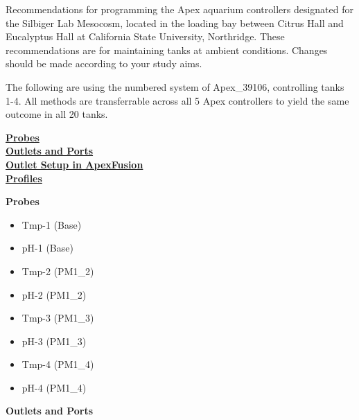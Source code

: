 \documentclass[]{book}
\providecommand{\tightlist}{%
  \setlength{\itemsep}{0pt}\setlength{\parskip}{0pt}}
\begin{document}
Recommendations for programming the Apex aquarium controllers designated
for the Silbiger Lab Mesocosm, located in the loading bay between Citrus
Hall and Eucalyptus Hall at California State University, Northridge.
These recommendations are for maintaining tanks at ambient conditions.
Changes should be made according to your study aims.

The following are using the numbered system of Apex\_39106, controlling
tanks 1-4. All methods are transferrable across all 5 Apex controllers
to yield the same outcome in all 20 tanks.

\protect\hyperlink{Probes}{\textbf{Probes}}\\
\protect\hyperlink{Outlets_and_Ports}{\textbf{Outlets and Ports}}\\
\protect\hyperlink{Outlet_Setup}{\textbf{Outlet Setup in ApexFusion}}\\
\protect\hyperlink{Profiles}{\textbf{Profiles}}

 \textbf{Probes}

\begin{itemize}
\tightlist
\item
  Tmp-1 (Base)
\item
  pH-1 (Base)
\item
  Tmp-2 (PM1\_2)
\item
  pH-2 (PM1\_2)
\item
  Tmp-3 (PM1\_3)
\item
  pH-3 (PM1\_3)
\item
  Tmp-4 (PM1\_4)
\item
  pH-4 (PM1\_4)
\end{itemize}

 \textbf{Outlets and Ports}
\end{document}
